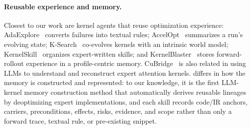 \paragraph{Reusable experience and memory.}
Closest to our work are kernel agents that reuse optimization experience: AdaExplore~\cite{adaexplore} converts failures into textual rules; AccelOpt~\citep{accelopt} summarizes a run's evolving state; K-Search~\citep{ksearch} co-evolves kernels with an intrinsic world model; KernelSkill~\cite{kernel_skill} organizes expert-written skills; and KernelBlaster~\citep{kernelblaster} stores forward-rollout experience in a profile-centric memory. CuBridge~\citep{cubridge} is also related in using LLMs to understand and reconstruct expert attention kernels. \sys differs in how the memory is constructed and represented: to our knowledge, it is the first LLM-kernel memory construction method that automatically derives reusable lineages by deoptimizing expert implementations, and each skill records code/IR anchors, carriers, preconditions, effects, risks, evidence, and scope rather than only a forward trace, textual rule, or pre-existing snippet.
